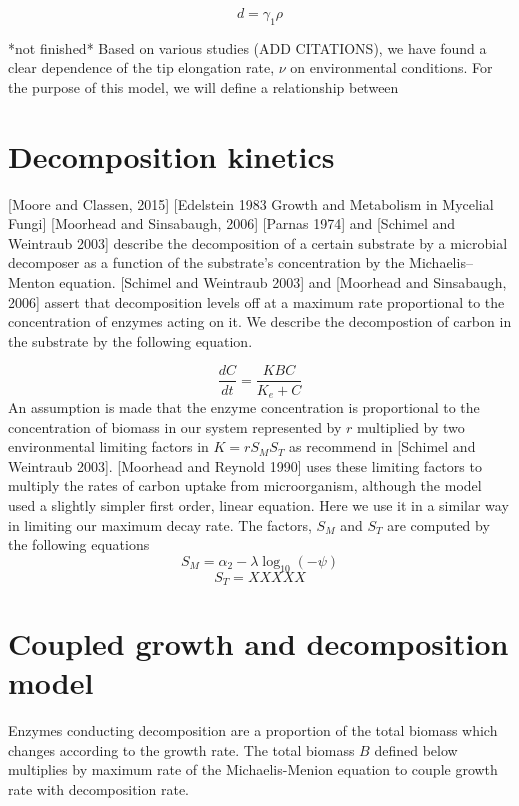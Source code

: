 \documentclass[10pt]{article}
\begin{document}
\begin{equation} \label {eq}
    d = \gamma_{1}\rho
\end{equation}

*not finished* Based on various studies (ADD CITATIONS), we have found a clear dependence of the tip elongation rate, $\nu$ on environmental conditions. For the purpose of this model, we will  define a relationship between 


\section*{Decomposition kinetics}
[Moore and Classen, 2015] [Edelstein 1983 Growth and Metabolism in Mycelial Fungi] [Moorhead and Sinsabaugh, 2006] [Parnas 1974] and [Schimel and Weintraub 2003] describe the decomposition of a certain substrate by a microbial decomposer as a function of the substrate's concentration by the Michaelis–Menton equation. [Schimel and Weintraub 2003] and [Moorhead and Sinsabaugh, 2006] assert that decomposition levels off at a maximum rate proportional to the concentration of enzymes acting on it. We describe the decompostion of carbon in the substrate by the following equation.

\begin{equation} \label{eq}
    \frac{dC}{dt} = \frac{KBC}{K_{e}+C}
\end{equation}
An assumption is made that the enzyme concentration is proportional to the concentration of biomass in our system represented by $r$ multiplied by two environmental limiting factors in $K=rS_{M}S_{T}$ as recommend in [Schimel and Weintraub 2003]. [Moorhead and Reynold 1990] uses these limiting factors to multiply the rates of carbon uptake from microorganism, although the model used a slightly simpler first order, linear equation. Here we use it in a similar way in limiting our maximum decay rate. The factors, $S_{M}$ and $S_{T}$ are computed by the following equations
\begin{equation} \label{eq}
    S_{M}=\alpha_{2} - \lambda \log_{10}(-\psi)
\end{equation}
\begin{equation} \label {eq}
    S_{T} = XXXXX
\end{equation}

\section*{Coupled growth and decomposition model}
Enzymes conducting decomposition are a proportion of the total biomass which changes according to the growth rate. The total biomass $B$ defined below multiplies by maximum rate of the Michaelis-Menion equation to couple growth rate with decomposition rate. 
\end{document}
